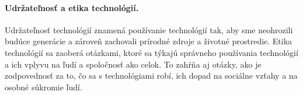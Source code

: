 \documentclass[10pt,oneside,slovak,a4paper]{article}
\begin{document}
\paragraph{Udržateľnosť a etika technológií.}

Udržateľnosť technológií znamená používanie technológií tak, aby sme neohrozili budúce generácie a zároveň zachovali prírodné zdroje a životné prostredie. Etika technológií sa zaoberá otázkami, ktoré sa týkajú správneho používania technológií a ich vplyvu na ľudí a spoločnosť ako celok. To zahŕňa aj otázky, ako je zodpovednosť za to, čo sa s technológiami robí, ich dopad na sociálne vzťahy a na osobné súkromie ľudí.






\end{document}
